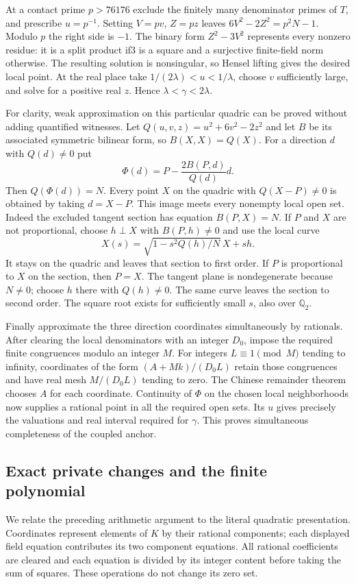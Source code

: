 At a contact prime $p>76176$ exclude the finitely many
denominator primes of $T$, and prescribe $u=p^{-1}$.
Setting $V=pv$, $Z=pz$ leaves
$6V^2-2Z^2=p^2N-1$.
Modulo $p$ the right side is $-1$. The binary form
$Z^2-3V^2$ represents every nonzero residue: it is a split
product if3 is a square and a surjective finite-field norm
otherwise. The resulting solution is nonsingular, so Hensel
lifting gives the desired local point. At the real place take
$1/(2\lambda)<u<1/\lambda$, choose $v$ sufficiently large,
and solve for a positive real $z$. Hence $\lambda<\gamma<2\lambda$.

For clarity, weak approximation on this particular quadric
can be proved without adding quantified witnesses.
Let $Q(u,v,z)=u^2+6v^2-2z^2$ and let $B$ be its associated
symmetric bilinear form, so $B(X,X)=Q(X)$.
For a direction $d$ with $Q(d)\ne0$ put
\[
 \Phi(d)=P-\frac{2B(P,d)}{Q(d)}d .
\]
Then $Q(\Phi(d))=N$. Every point $X$ on the quadric with
$Q(X-P)\ne0$ is obtained by taking $d=X-P$.
This image meets every nonempty local open set. Indeed the
excluded tangent section has equation $B(P,X)=N$.
If $P$ and $X$ are not proportional, choose
$h\perp X$ with $B(P,h)\ne0$ and use the local curve
\[
 X(s)=\sqrt{1-s^2Q(h)/N}\,X+sh .
\]
It stays on the quadric and leaves that section to first
order. If $P$ is proportional to $X$ on the section, then
$P=X$. The tangent plane is nondegenerate because $N\ne0$;
choose $h$ there with $Q(h)\ne0$. The same curve leaves the
section to second order. The square root exists for
sufficiently small $s$, also over $\mathbb Q_2$.

Finally approximate the three direction coordinates
simultaneously by rationals. After clearing the local
denominators with an integer $D_0$, impose the required finite
congruences modulo an integer $M$. For integers
$L\equiv1\pmod M$ tending to infinity, coordinates of the form
$(A+Mk)/(D_0L)$ retain those congruences and have real mesh
$M/(D_0L)$ tending to zero. The Chinese remainder theorem
chooses $A$ for each coordinate. Continuity of $\Phi$ on the
chosen local neighborhoods now supplies a rational point in
all the required open sets. Its $u$ gives precisely the
valuations and real interval required for $\gamma$.
This proves simultaneous completeness of the coupled anchor.

\subsection{Exact private changes and the finite polynomial}
\label{subsec:v14-finite}
We relate the preceding arithmetic argument to the literal
quadratic presentation. Coordinates represent elements of
$K$ by their rational components; each displayed field
equation contributes its two component equations.
All rational coefficients are cleared and each equation is
divided by its integer content before taking the sum of
squares. These operations do not change its zero set.


